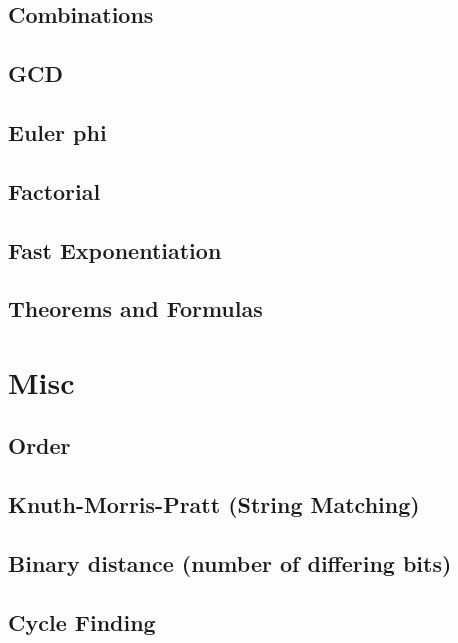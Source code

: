 \documentclass[10pt]{article}
\begin{document}
		\subsection{Combinations}
		
		
		\subsection{GCD}
		
		
		\subsection{Euler phi}
		
		\newpage
		
		\subsection{Factorial}
		
		
		\subsection{Fast Exponentiation}
		
		
		\subsection{Theorems and Formulas}
		
		
	\newpage
	\section{Misc}
		\subsection{Order}
		
		
		\subsection{Knuth-Morris-Pratt (String Matching)}
		
		
		\subsection{Binary distance (number of differing bits)}
		
		
		\subsection{Cycle Finding}
		
		
\end{document}
